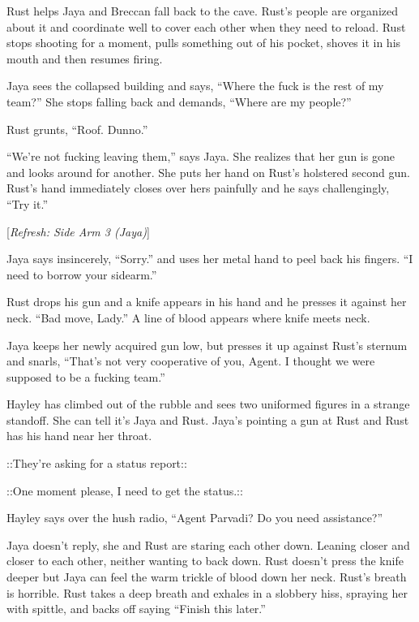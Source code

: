 Rust helps Jaya and Breccan fall back to the cave.  Rust's people are organized about it and coordinate well to cover each other when they need to reload.  Rust stops shooting for a moment, pulls something out of his pocket, shoves it in his mouth and then resumes firing.



Jaya sees the collapsed building and says, ``Where the fuck is the rest of my team?''  She stops falling back and demands, ``Where are my people?''

Rust grunts, ``Roof.  Dunno.''

``We're not fucking leaving them,'' says Jaya.  She realizes that her gun is gone and looks around for another.   She puts her hand on Rust's holstered second gun.  Rust's hand immediately closes over hers painfully and he says challengingly, ``Try it.''  

{[}\textit{Refresh: Side Arm 3 (Jaya)}{]}

Jaya says insincerely, ``Sorry.'' and uses her metal hand to peel back his fingers. ``I need to borrow your sidearm.''

Rust drops his gun and a knife appears in his hand and he presses it against her neck. ``Bad move, Lady.'' A line of blood appears where knife meets neck.

Jaya keeps her newly acquired gun low, but presses it up against Rust's sternum and snarls, ``That's not very cooperative of you, Agent.  I thought we were supposed to be a fucking team.''



Hayley has climbed out of the rubble and sees two uniformed figures in a strange standoff.  She can tell it's Jaya and Rust.  Jaya's pointing a gun at Rust and Rust has his hand near her throat.

 {\color[RGB]{153,0,255}::They're asking for a status report::} 

 {\color[RGB]{230,145,56}::One moment please, I need to get the status.::}  {\color[RGB]{255,153,0} } 

Hayley says over the hush radio, ``Agent Parvadi?  Do you need assistance?''

Jaya doesn't reply, she and Rust are staring each other down.  Leaning closer and closer to each other, neither wanting to back down.  Rust doesn't press the knife deeper but Jaya can feel the warm trickle of blood down her neck.  Rust's breath is horrible.  Rust takes a deep breath and exhales in a slobbery hiss, spraying her with spittle, and backs off saying ``Finish this later.''



